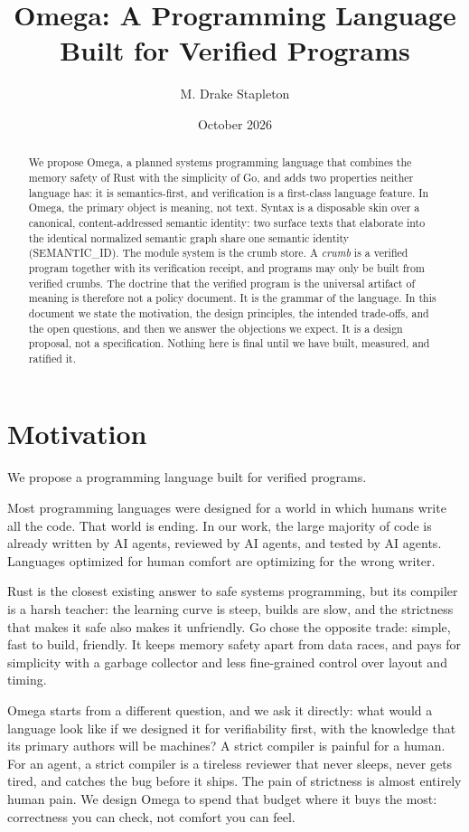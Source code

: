 \documentclass[11pt]{article}
\title{Omega: A Programming Language Built for Verified Programs}
\author{M. Drake Stapleton}
\date{October 2026}
\begin{document}
\maketitle

\begin{abstract}
We propose Omega, a planned systems programming language that combines
the memory safety of Rust with the simplicity of Go, and
adds two properties neither language has: it is semantics-first, and
verification is a first-class language feature. In Omega, the primary
object is meaning, not text. Syntax is a disposable skin over a canonical,
content-addressed semantic identity: two surface texts that elaborate into
the identical normalized semantic graph share one semantic identity
(SEMANTIC\_ID). The module system is the crumb store. A \emph{crumb} is
a verified program together with its verification receipt, and programs
may only be built from verified crumbs. The doctrine that the verified
program is the universal artifact of meaning is therefore not a policy
document. It is the grammar of the language. In this document we state the
motivation, the design principles, the intended trade-offs, and the open
questions, and then we answer the objections we expect. It is a design
proposal, not a specification. Nothing here is final until we have built,
measured, and ratified it.
\end{abstract}

\section{Motivation}

We propose a programming language built for verified programs.

Most programming languages were designed for a world in which humans write
all the code. That world is ending. In our work, the large majority
of code is already written by AI agents, reviewed by AI agents, and tested by
AI agents. Languages optimized for human comfort are optimizing for the
wrong writer.

Rust is the closest existing answer to safe systems programming, but its
compiler is a harsh teacher: the learning curve is steep, builds are slow,
and the strictness that makes it safe also makes it unfriendly. Go chose the
opposite trade: simple, fast to build, friendly. It keeps memory safety
apart from data races, and pays for simplicity with a garbage collector
and less fine-grained control over layout and timing.

Omega starts from a different question, and we ask it directly: what would
a language look like if we designed it for verifiability first, with the
knowledge that its primary authors will be machines? A strict compiler is
painful for a human.
For an agent, a strict compiler is a tireless reviewer that never sleeps,
never gets tired, and catches the bug before it ships. The pain of
strictness is almost entirely human pain. We design Omega to spend that
budget where it buys the most: correctness you can check, not comfort you
can feel.
\end{document}
